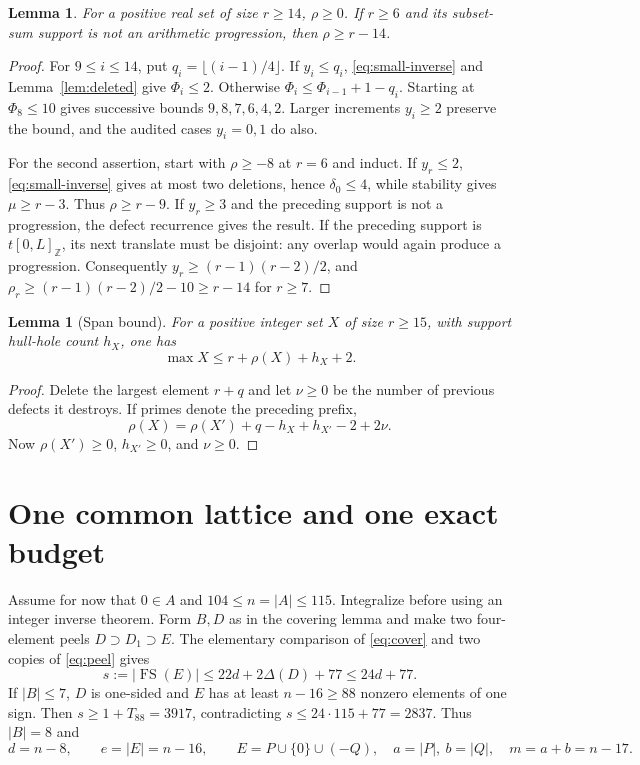 \documentclass[11pt,a4paper]{article}
\newcommand{\FS}{\operatorname{FS}}
\newcommand{\Z}{\mathbb Z}
\newtheorem{lemma}[theorem]{Lemma}
\begin{document}
\begin{lemma}\label{lem:threshold}
For a positive real set of size $r\ge14$, $\rho\ge0$.
If $r\ge6$ and its subset-sum support is not an arithmetic progression,
then $\rho\ge r-14$.
\end{lemma}
\begin{proof}
For $9\le i\le14$, put $q_i=\lfloor(i-1)/4\rfloor$. If $y_i\le q_i$,
\eqref{eq:small-inverse} and Lemma~\ref{lem:deleted} give $\Phi_i\le2$.
Otherwise $\Phi_i\le\Phi_{i-1}+1-q_i$. Starting at $\Phi_8\le10$ gives
successive bounds $9,8,7,6,4,2$. Larger increments $y_i\ge2$ preserve
the bound, and the audited cases $y_i=0,1$ do also.

For the second assertion, start with $\rho\ge-8$ at $r=6$ and induct.
If $y_r\le2$, \eqref{eq:small-inverse} gives at most two deletions, hence
$\delta_0\le4$, while stability gives $\mu\ge r-3$. Thus $\rho\ge r-9$.
If $y_r\ge3$ and the preceding support is not a progression, the defect
recurrence gives the result. If the preceding support is $t[0,L]_{\Z}$,
its next translate must be disjoint: any overlap would again produce a
progression. Consequently $y_r\ge(r-1)(r-2)/2$, and
$\rho_r\ge(r-1)(r-2)/2-10\ge r-14$ for $r\ge7$.
\end{proof}

\begin{lemma}[Span bound]\label{lem:span}
For a positive integer set $X$ of size $r\ge15$, with support hull-hole
count $h_X$, one has
\[
 \max X\le r+\rho(X)+h_X+2.
\]
\end{lemma}
\begin{proof}
Delete the largest element $r+q$ and let $\nu\ge0$ be the number of
previous defects it destroys. If primes denote the preceding prefix,
\[
 \rho(X)=\rho(X')+q-h_X+h_{X'}-2+2\nu.
\]
Now $\rho(X')\ge0$, $h_{X'}\ge0$, and $\nu\ge0$.
\end{proof}

\section{One common lattice and one exact budget}
Assume for now that $0\in A$ and $104\le n=|A|\le115$. Integralize
before using an integer inverse theorem. Form $B,D$ as in the covering
lemma and make two four-element peels $D\supset D_1\supset E$.
The elementary comparison of \eqref{eq:cover} and two copies of
\eqref{eq:peel} gives
\begin{equation}\label{eq:crude-core}
 s:=|\FS(E)|\le22d+2\Delta(D)+77\le24d+77.
\end{equation}
If $|B|\le7$, $D$ is one-sided and $E$ has at least $n-16\ge88$
nonzero elements of one sign. Then $s\ge1+T_{88}=3917$, contradicting
$s\le24\cdot115+77=2837$. Thus $|B|=8$ and
\[
 d=n-8,\qquad e=|E|=n-16,\qquad
 E=P\cup\{0\}\cup(-Q),\quad a=|P|,\ b=|Q|,\quad m=a+b=n-17.
\]
\end{document}
